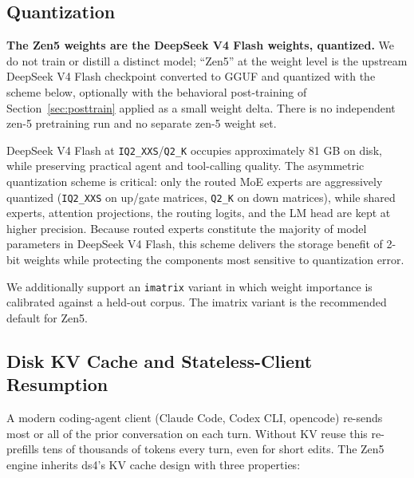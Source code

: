 \documentclass[11pt,a4paper]{article}
\begin{document}
\subsection{Quantization}

\textbf{The Zen5 weights are the DeepSeek V4 Flash weights, quantized.} We do not train or distill a
distinct model; ``Zen5'' at the weight level is the upstream DeepSeek V4 Flash checkpoint
\cite{deepseekv4flash} converted to GGUF and quantized with the scheme below, optionally with the
behavioral post-training of Section~\ref{sec:posttrain} applied as a small weight delta. There is no
independent zen-5 pretraining run and no separate zen-5 weight set.

DeepSeek V4 Flash at \texttt{IQ2\_XXS}/\texttt{Q2\_K} occupies approximately 81 GB on disk, while
preserving practical agent and tool-calling quality. The asymmetric quantization scheme is critical:
only the routed MoE experts are aggressively quantized (\texttt{IQ2\_XXS} on up/gate matrices,
\texttt{Q2\_K} on down matrices), while shared experts, attention projections, the routing logits,
and the LM head are kept at higher precision. Because routed experts constitute the majority of
model parameters in DeepSeek V4 Flash, this scheme delivers the storage benefit of 2-bit weights
while protecting the components most sensitive to quantization error.

We additionally support an \texttt{imatrix} variant in which weight importance is calibrated against a
held-out corpus. The imatrix variant is the recommended default for Zen5.

\subsection{Disk KV Cache and Stateless-Client Resumption}

A modern coding-agent client (Claude Code, Codex CLI, opencode) re-sends most or all of the prior
conversation on each turn. Without KV reuse this re-prefills tens of thousands of tokens every turn,
even for short edits. The Zen5 engine inherits ds4's KV cache design with three properties:
\end{document}
